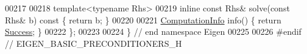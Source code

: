 \begin{DoxyCode}
00217     
00218     \textcolor{keyword}{template}<\textcolor{keyword}{typename} Rhs>
00219     \textcolor{keyword}{inline} \textcolor{keyword}{const} Rhs& solve(\textcolor{keyword}{const} Rhs& b)\textcolor{keyword}{ const }\{ \textcolor{keywordflow}{return} b; \}
00220     
00221     \hyperlink{group__enums_ga85fad7b87587764e5cf6b513a9e0ee5e}{ComputationInfo} info() \{ \textcolor{keywordflow}{return} \hyperlink{group__enums_gga85fad7b87587764e5cf6b513a9e0ee5ea52581b035f4b59c203b8ff999ef5fcea}{Success}; \}
00222 \};
00223 
00224 \} \textcolor{comment}{// end namespace Eigen}
00225 
00226 \textcolor{preprocessor}{#endif // EIGEN\_BASIC\_PRECONDITIONERS\_H}
\end{DoxyCode}
